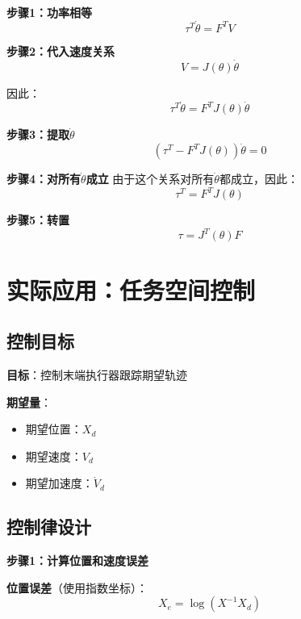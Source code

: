 \documentclass[12pt,a4paper]{article}
\begin{document}
\textbf{步骤1：功率相等}
\begin{equation}
\tau^T\dot{\theta} = F^T V
\end{equation}

\textbf{步骤2：代入速度关系}
\begin{equation}
V = J(\theta)\dot{\theta}
\end{equation}

因此：
\begin{equation}
\tau^T\dot{\theta} = F^T J(\theta)\dot{\theta}
\end{equation}

\textbf{步骤3：提取$\dot{\theta}$}
\begin{equation}
(\tau^T - F^T J(\theta))\dot{\theta} = 0
\end{equation}

\textbf{步骤4：对所有$\dot{\theta}$成立}
由于这个关系对所有$\dot{\theta}$都成立，因此：
\begin{equation}
\tau^T = F^T J(\theta)
\end{equation}

\textbf{步骤5：转置}
\begin{equation}
\tau = J^T(\theta)F \tag{8.51}
\end{equation}

\section{实际应用：任务空间控制}

\subsection{控制目标}

\textbf{目标}：控制末端执行器跟踪期望轨迹

\textbf{期望量}：
\begin{itemize}
\item 期望位置：$X_d$
\item 期望速度：$V_d$
\item 期望加速度：$\dot{V}_d$
\end{itemize}

\subsection{控制律设计}

\textbf{步骤1：计算位置和速度误差}

\textbf{位置误差}（使用指数坐标）：
\begin{equation}
X_e = \log(X^{-1} X_d)
\end{equation}
\end{document}
